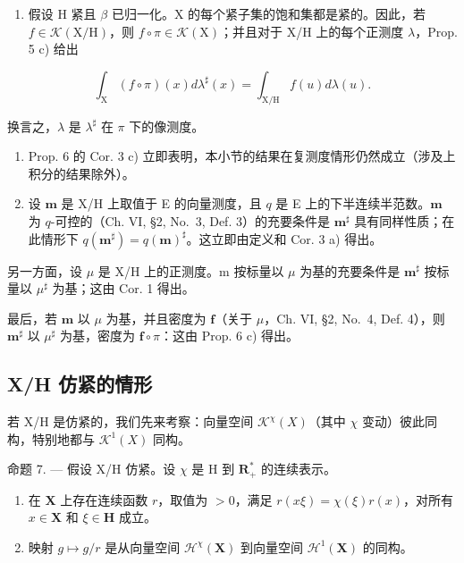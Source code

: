 \begin{enumerate}
\def\labelenumi{\arabic{enumi})}
\setcounter{enumi}{1}
\tightlist
\item
  假设 H 紧且 \(\beta\) 已归一化。X 的每个紧子集的饱和集都是紧的。因此，若 \(f \in \mathcal{K}(\mathrm{X}/\mathrm{H})\)，则 \(f \circ \pi \in \mathcal{K}(\mathrm{X})\)；并且对于 X/H 上的每个正测度 \(\lambda\)，Prop. 5 c) 给出
\end{enumerate}

\[
\int_ {\mathrm{X}} (f \circ \pi) (x) d \lambda^ {\sharp} (x) = \int_ {\mathrm{X/H}} f (u) d \lambda (u).
\]

换言之，\(\lambda\) 是 \(\lambda^{\sharp}\) 在 \(\pi\) 下的像测度。

\begin{enumerate}
\def\labelenumi{\arabic{enumi})}
\setcounter{enumi}{2}
\item
  Prop. 6 的 Cor. 3 c) 立即表明，本小节的结果在复测度情形仍然成立（涉及上积分的结果除外）。
\item
  设 \(\mathbf{m}\) 是 X/H 上取值于 E 的向量测度，且 \(q\) 是 E 上的下半连续半范数。\(\mathbf{m}\) 为 \(q\)-可控的（Ch. VI, §2, No.~3, Def. 3）的充要条件是 \(\mathbf{m}^{\sharp}\) 具有同样性质；在此情形下 \(q(\mathbf{m}^{\sharp}) = q(\mathbf{m})^{\sharp}\)。这立即由定义和 Cor. 3 a) 得出。
\end{enumerate}

另一方面，设 \(\mu\) 是 X/H 上的正测度。m 按标量以 \(\mu\) 为基的充要条件是 \(\mathbf{m}^{\sharp}\) 按标量以 \(\mu^{\sharp}\) 为基；这由 Cor. 1 得出。

最后，若 \(\mathbf{m}\) 以 \(\mu\) 为基，并且密度为 \(\mathbf{f}\)（关于 \(\mu\)，Ch. VI, §2, No.~4, Def. 4），则 \(\mathbf{m}^{\sharp}\) 以 \(\mu^{\sharp}\) 为基，密度为 \(\mathbf{f} \circ \pi\)：这由 Prop. 6 c) 得出。

\subsection{X/H 仿紧的情形}

若 X/H 是仿紧的，我们先来考察：向量空间 \(\mathcal{K}^{\chi}(X)\)（其中 \(\chi\) 变动）彼此同构，特别地都与 \(\mathcal{K}^{1}(X)\) 同构。

命题 7. --- 假设 X/H 仿紧。设 \(\chi\) 是 H 到 \(\mathbf{R}_{+}^{*}\) 的连续表示。

\begin{enumerate}
\def\labelenumi{\alph{enumi})}
\item
  在 \(\mathbf{X}\) 上存在连续函数 \(r\)，取值为 \(>0\)，满足 \(r(x\xi) = \chi (\xi)r(x)\)，对所有 \(x\in \mathbf{X}\) 和 \(\xi \in \mathbf{H}\) 成立。
\item
  映射 \(g \mapsto g / r\) 是从向量空间 \(\mathcal{H}^{\chi}(\mathbf{X})\) 到向量空间 \(\mathcal{H}^{1}(\mathbf{X})\) 的同构。
\end{enumerate}

